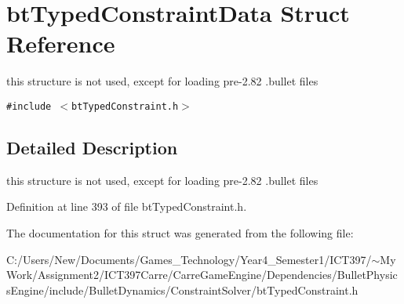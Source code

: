 \hypertarget{structbt_typed_constraint_data}{
\section{btTypedConstraintData Struct Reference}
\label{structbt_typed_constraint_data}
}
this structure is not used, except for loading pre-2.82 .bullet files  


{\tt \#include $<$btTypedConstraint.h$>$}



\subsection{Detailed Description}
this structure is not used, except for loading pre-2.82 .bullet files 

Definition at line 393 of file btTypedConstraint.h.

The documentation for this struct was generated from the following file:\begin{CompactItemize}
\item 
C:/Users/New/Documents/Games\_\-Technology/Year4\_\-Semester1/ICT397/$\sim$My Work/Assignment2/ICT397Carre/CarreGameEngine/Dependencies/BulletPhysicsEngine/include/BulletDynamics/ConstraintSolver/btTypedConstraint.h\end{CompactItemize}
